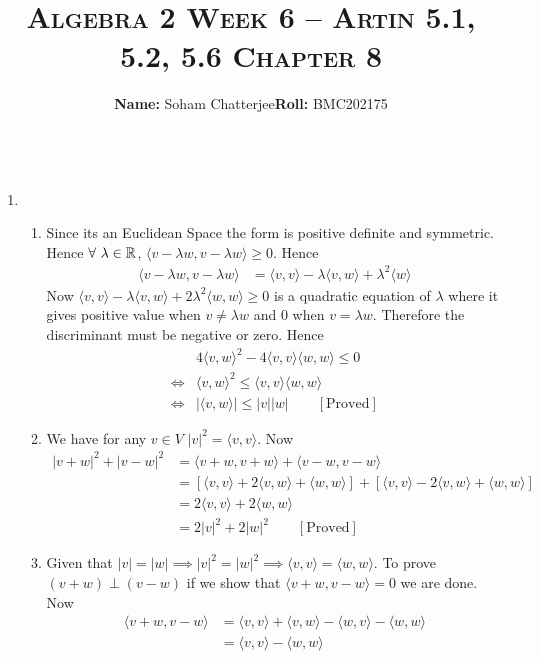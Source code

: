 \documentclass{article}
\title{\LARGE{\textsc{Algebra 2 Week 6 -- Artin 5.1, 5.2, 5.6 Chapter 8}}}
\author{\LARGE{\textsf{\textbf{Name:} Soham Chatterjee\hfill \textbf{Roll:} BMC202175}\\\hrule}}
\date{}
\begin{document}
	
\maketitle
\thispagestyle{empty}
	\begin{enumerate}[label=5.\arabic*.]
		\item \begin{enumerate}
			\item Since its an Euclidean Space the form is positive definite and symmetric. Hence $\forall\ \lambda\in\bbR$,  $\langle v-\lambda w,v-\lambda w\rangle\geq0$. Hence \begin{align*}
				\langle v-\lambda w,v-\lambda w\rangle & = \langle v,v\rangle - \lambda\langle v,w\rangle +\lambda^2\langle w\rangle
			\end{align*}Now $\langle v,v\rangle - \lambda\langle v,w\rangle +2\lambda^2\langle w,w\rangle\geq 0$ is a quadratic  equation of $\lambda$ where it gives positive value when $v\neq \lambda w$ and 0 when $v=\lambda w$. Therefore the discriminant must be negative or zero. Hence \begin{align*}
				 & 4\langle v,w\rangle ^2-4\langle v,v\rangle\langle w,w\rangle\leq 0\\
			\iff & \langle v,w\rangle^2\leq \langle v,v\rangle\langle w ,w\rangle\\
			\iff & |\langle v,w\rangle| \leq | v||w|\qquad [\text{Proved}]
		\end{align*}
		\item We have for any $v\in V$ $|v|^2=\langle v,v\rangle$. Now \begin{align*}
			|v+w|^2 + |v-w|^2 & = \langle v+w,v+w\rangle +\langle v-w,v-w\rangle \\
			& = [\langle v,v\rangle +2\langle v,w\rangle  +\langle w,w\rangle] +[\langle v,v\rangle -2\langle v,w\rangle +\langle w,w\rangle]\\
			& = 2\langle v,v\rangle +2\langle w,w\rangle \\
			& =2|v|^2+2|w|^2\qquad [\text{Proved}]
		\end{align*}
	\item Given that $|v|=|w|\implies |v|^2=|w|^2\implies \langle v,v\rangle=\langle w,w\rangle$. To prove $(v+w)\perp (v-w)$ if we show that $\langle v+w,v-w\rangle=0$ we are done. Now \begin{align*}
		\langle v+w,v-w\rangle & = \langle v,v\rangle +\langle v,w\rangle - \langle w,v\rangle -\langle w,w\rangle \\
		& = \langle v,v\rangle -\langle w,w\rangle\\

\end{align*}
\end{enumerate}
\end{enumerate}
\end{document}
